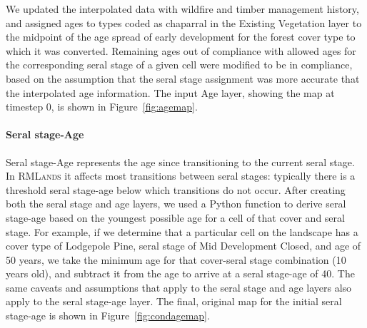 We updated the interpolated data with wildfire and timber management history, and assigned ages to types coded as chaparral in the Existing Vegetation layer to the midpoint of the age spread of early development for the forest cover type to which it was converted. Remaining ages out of compliance with allowed ages for the corresponding seral stage of a given cell were modified to be in compliance, based on the assumption that the seral stage assignment was more accurate that the interpolated age information. The input Age layer, showing the map at timestep 0, is shown in Figure~\ref{fig:agemap}.


\paragraph{Seral stage-Age}
Seral stage-Age represents the age since transitioning to the current seral stage. In \textsc{RMLands} it affects most transitions between seral stages: typically there is a threshold seral stage-age below which transitions do not occur. After creating both the seral stage and age layers, we used a Python function to derive seral stage-age based on the youngest possible age for a cell of that cover and seral stage. For example, if we determine that a particular cell on the landscape has a cover type of Lodgepole Pine, seral stage of Mid Development Closed, and age of 50 years, we take the minimum age for that cover-seral stage combination (10 years old), and subtract it from the age to arrive at a seral stage-age of 40. The same caveats and assumptions that apply to the seral stage and age layers also apply to the seral stage-age layer. The final, original map for the initial seral stage-age is shown in Figure~\ref{fig:condagemap}.



